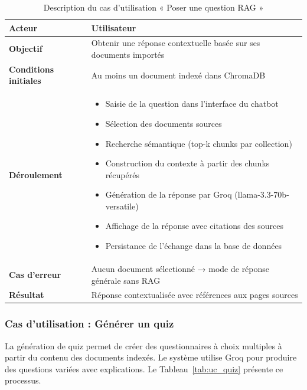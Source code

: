 \begin{table}[H]
\centering
\renewcommand{\arraystretch}{1.2}
\begin{tabular}{|p{4cm}|p{10cm}|}
\hline
\textbf{Acteur} & Utilisateur \\ \hline

\textbf{Objectif} & Obtenir une réponse contextuelle basée sur ses documents importés \\ \hline

\textbf{Conditions initiales} & Au moins un document indexé dans ChromaDB \\ \hline

\textbf{Déroulement} &
\begin{itemize}
    \item Saisie de la question dans l'interface du chatbot
    \item Sélection des documents sources
    \item Recherche sémantique (top-k chunks par collection)
    \item Construction du contexte à partir des chunks récupérés
    \item Génération de la réponse par Groq (llama-3.3-70b-versatile)
    \item Affichage de la réponse avec citations des sources
    \item Persistance de l'échange dans la base de données
\end{itemize} \\ \hline

\textbf{Cas d'erreur} & Aucun document sélectionné → mode de réponse générale sans RAG \\ \hline

\textbf{Résultat} & Réponse contextualisée avec références aux pages sources \\ \hline
\end{tabular}
\caption{Description du cas d'utilisation « Poser une question RAG »}
\label{tab:uc_rag_chat}
\end{table}

\subsubsection{Cas d'utilisation : Générer un quiz}

La génération de quiz permet de créer des questionnaires à choix multiples à partir du contenu des documents indexés. Le système utilise Groq pour produire des questions variées avec explications. Le Tableau~\ref{tab:uc_quiz} présente ce processus.

